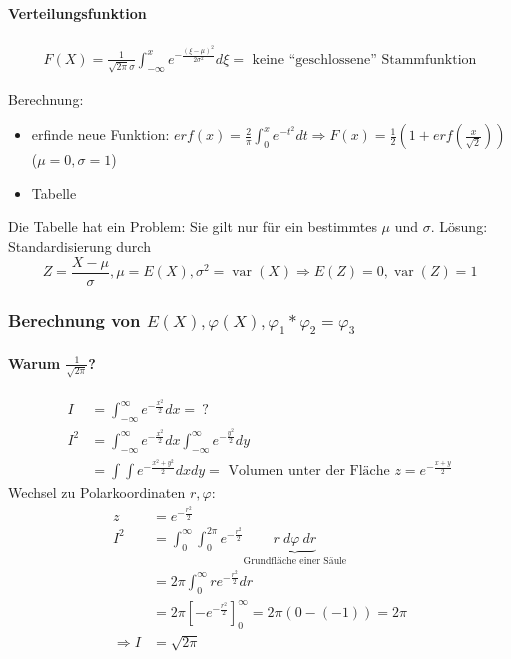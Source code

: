 \documentclass[10pt,a4paper]{scrartcl}
\newif\ifincludeDerivations
\DeclareMathOperator{\var}{var}
\begin{document}
\paragraph{Verteilungsfunktion}
\begin{align*}
F(X) = \frac{1}{\sqrt{2\pi}\sigma} \int_{-\infty}^x e^{-\frac{(\xi-\mu)^2}{2\sigma^2}} d\xi = \text{ keine ``geschlossene'' Stammfunktion}
\end{align*}


\ifincludeDerivations
Berechnung:
\begin{itemize}
\item erfinde neue Funktion: $erf(x) = \frac{2}{\pi} \int_0^x e^{-t^2}dt \Rightarrow F(x) 
         = \frac{1}{2}\left(1 + erf\left(\frac{x}{\sqrt{2}}\right)\right)$ ($\mu = 0, \sigma = 1$)
\item Tabelle
\end{itemize}

Die Tabelle hat ein Problem: Sie gilt nur für ein bestimmtes $\mu$ und $\sigma$.
Lösung: Standardisierung durch $$Z = \frac{X - \mu}{\sigma}, \mu = E(X), \sigma^2 = \var(X) \Longrightarrow E(Z) = 0, \var(Z) = 1$$ 

\subsubsection{Berechnung von $E(X), \varphi(X), \varphi_1 * \varphi_2 = \varphi_3$}
\paragraph{Warum $\frac{1}{\sqrt{2\pi}}$?}
\begin{align*}
I & = \int_{-\infty}^\infty e^{-\frac{x^2}{2}} dx = \ ? \\
I^2 & = \int_{-\infty}^\infty e^{-\frac{x^2}{2}} dx \int_{-\infty}^\infty e^{-\frac{y^2}{2}} dy \\
    & = \int \int e^{-\frac{x^2 + y^2}{2}} dx dy = \text{ Volumen unter der Fläche } z = e^{-\frac{x+y}{2}}
\end{align*}
Wechsel zu Polarkoordinaten $r, \varphi$:
\begin{align*}
z & = e^{-\frac{r^2}{2}} \\
I^2 & = \int_0^\infty \int_0^{2\pi} e^{-\frac{r^2}{2}} \underbrace{r\ d\varphi\ dr}_{\text{Grundfläche einer Säule}} \\
    & = 2\pi \int_0^\infty re^{-\frac{r^2}{2}} dr \\
    & = 2\pi \left[ -e^{-\frac{r^2}{2}} \right]_0^\infty = 2\pi (0 - (-1)) = 2\pi \\
\Rightarrow I &= \sqrt{2\pi}
\end{align*}
\end{document}
